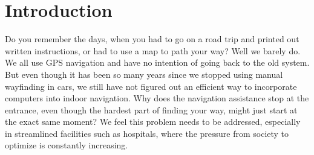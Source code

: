 \chapter{Introduction}\label{intro}

Do you remember the days, when you had to go on a road trip and printed out written instructions, or had to use a map to path your way? Well we barely do. We all use GPS navigation and have no intention of going back to the old system. But even though it has been so many years since we stopped using manual wayfinding in cars, we still have not figured out an efficient way to incorporate computers into indoor navigation. Why does the navigation assistance stop at the entrance, even though the hardest part of finding your way, might just start at the exact same moment? We feel this problem needs to be addressed, especially in streamlined facilities such as hospitals, where the pressure from society to optimize is constantly increasing.